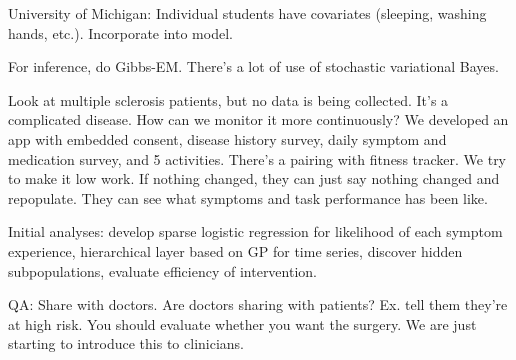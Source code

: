 University of Michigan: 
Individual students have covariates (sleeping, washing hands, etc.). Incorporate into model. 

For inference, do Gibbs-EM. There's a lot of use of stochastic variational Bayes. 

Look at multiple sclerosis patients, but no data is being collected. It's a complicated disease. How can we monitor it more continuously? We developed an app with embedded consent, disease history survey, daily symptom and medication survey, and 5 activities. There's a pairing with fitness tracker. We try to make it low work. If nothing changed, they can just say nothing changed and repopulate. They can see what symptoms and task performance has been like.

Initial analyses: develop sparse logistic regression for likelihood of each symptom experience, hierarchical layer based on GP for time series, discover hidden subpopulations, evaluate efficiency of intervention.


QA: Share with doctors. Are doctors sharing with patients? Ex. tell them they're at high risk. You should evaluate whether you want the surgery.  We are just starting to introduce this to clinicians.